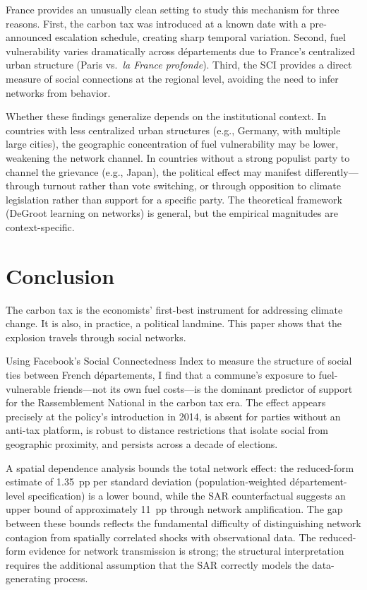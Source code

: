 \documentclass[12pt]{article}
\newcommand{\rn}{Rassemblement National}
\newcommand{\dept}{d\'{e}partement}
\newcommand{\depts}{d\'{e}partements}
\begin{document}
France provides an unusually clean setting to study this mechanism for three reasons. First, the carbon tax was introduced at a known date with a pre-announced escalation schedule, creating sharp temporal variation. Second, fuel vulnerability varies dramatically across \depts{} due to France's centralized urban structure (Paris vs.\ \textit{la France profonde}). Third, the SCI provides a direct measure of social connections at the regional level, avoiding the need to infer networks from behavior.

Whether these findings generalize depends on the institutional context. In countries with less centralized urban structures (e.g., Germany, with multiple large cities), the geographic concentration of fuel vulnerability may be lower, weakening the network channel. In countries without a strong populist party to channel the grievance (e.g., Japan), the political effect may manifest differently---through turnout rather than vote switching, or through opposition to climate legislation rather than support for a specific party. The theoretical framework (DeGroot learning on networks) is general, but the empirical magnitudes are context-specific.



\section{Conclusion}
\label{sec:conclusion}

The carbon tax is the economists' first-best instrument for addressing climate change. It is also, in practice, a political landmine. This paper shows that the explosion travels through social networks.

Using Facebook's Social Connectedness Index to measure the structure of social ties between French \depts{}, I find that a commune's exposure to fuel-vulnerable friends---not its own fuel costs---is the dominant predictor of support for the \rn{} in the carbon tax era. The effect appears precisely at the policy's introduction in 2014, is absent for parties without an anti-tax platform, is robust to distance restrictions that isolate social from geographic proximity, and persists across a decade of elections.

A spatial dependence analysis bounds the total network effect: the reduced-form estimate of 1.35~pp per standard deviation (population-weighted \dept{}-level specification) is a lower bound, while the SAR counterfactual suggests an upper bound of approximately 11~pp through network amplification. The gap between these bounds reflects the fundamental difficulty of distinguishing network contagion from spatially correlated shocks with observational data. The reduced-form evidence for network transmission is strong; the structural interpretation requires the additional assumption that the SAR correctly models the data-generating process.
\end{document}
